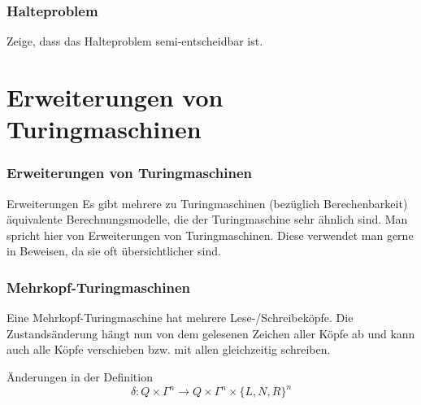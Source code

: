 \begin{frame}
 \frametitle{Halteproblem}
 Zeige, dass das Halteproblem semi-entscheidbar ist.
\end{frame}

\section{Erweiterungen von Turingmaschinen}
\begin{frame}
\frametitle{Erweiterungen von Turingmaschinen}
\begin{block}{Erweiterungen}
Es gibt mehrere zu Turingmaschinen (bezüglich Berechenbarkeit) äquivalente Berechnungsmodelle, die der Turingmaschine sehr ähnlich sind. Man spricht hier von Erweiterungen von Turingmaschinen. Diese verwendet man gerne in Beweisen, da sie oft übersichtlicher sind.
\end{block}
\end{frame}
\begin{frame}
\frametitle{Mehrkopf-Turingmaschinen}
\begin{figure}[H]
\begin{center}
\end{center}
\end{figure}
Eine Mehrkopf-Turingmaschine hat mehrere Lese-/Schreibeköpfe. Die Zustandsänderung hängt nun von dem gelesenen Zeichen aller Köpfe ab und kann auch alle Köpfe verschieben bzw. mit allen gleichzeitig schreiben.
\begin{block}{Änderungen in der Definition}
$$ \delta: Q \times \Gamma^n \rightarrow Q \times \Gamma^n \times \{L,N,R\}^n$$
\end{block}
\end{frame}

